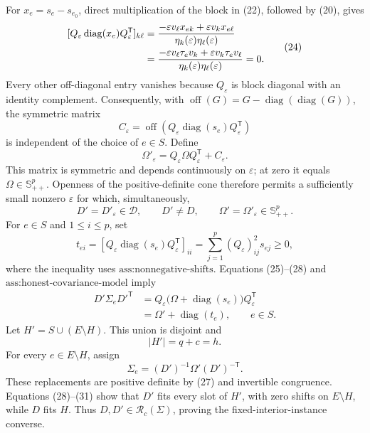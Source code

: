 For \(x_e=s_e-s_{e_0}\), direct multiplication of the block in (22), followed by (20), gives
\[
 \begin{aligned}
 \relax[Q_\varepsilon\operatorname{diag}(x_e)Q_\varepsilon^{\mathsf T}]_{k\ell}
 &=\frac{-\varepsilon v_\ell x_{ek}+\varepsilon v_kx_{e\ell}}
 {\eta_k(\varepsilon)\eta_\ell(\varepsilon)}\\
 &=\frac{-\varepsilon v_\ell\tau_ev_k+\varepsilon v_k\tau_ev_\ell}
 {\eta_k(\varepsilon)\eta_\ell(\varepsilon)}=0.
 \end{aligned}
 \tag{24}
\]
Every other off-diagonal entry vanishes because \(Q_\varepsilon\) is block diagonal with an identity complement.  Consequently, with \(\operatorname{off}(G)=G-\operatorname{diag}(\operatorname{diag}(G))\), the symmetric matrix
\[
 C_\varepsilon
 =\operatorname{off}\!\left(Q_\varepsilon
 \operatorname{diag}(s_e)Q_\varepsilon^{\mathsf T}\right)
 \tag{25}
\]
is independent of the choice of \(e\in S\).  Define
\[
 \Omega'_\varepsilon
 =Q_\varepsilon\Omega Q_\varepsilon^{\mathsf T}+C_\varepsilon.
 \tag{26}
\]
This matrix is symmetric and depends continuously on \(\varepsilon\); at zero it equals \(\Omega\in\mathbb S_{++}^p\).  Openness of the positive-definite cone therefore permits a sufficiently small nonzero \(\varepsilon\) for which, simultaneously,
\[
 D'=D'_{\varepsilon}\in\mathcal D,
 \qquad D'\ne D,
 \qquad \Omega'=\Omega'_\varepsilon\in\mathbb S_{++}^p.
 \tag{27}
\]
For \(e\in S\) and \(1\le i\le p\), set
\[
 t_{ei}
 =[Q_\varepsilon\operatorname{diag}(s_e)Q_\varepsilon^{\mathsf T}]_{ii}
 =\sum_{j=1}^p(Q_\varepsilon)_{ij}^2s_{ej}\ge0,
 \tag{28}
\]
where the inequality uses \(\text{ass:nonnegative-shifts}\).  Equations (25)--(28) and \(\text{ass:honest-covariance-model}\) imply
\[
 \begin{aligned}
 D'\Sigma_eD'^{\mathsf T}
 &=Q_\varepsilon\bigl(\Omega+\operatorname{diag}(s_e)\bigr)Q_\varepsilon^{\mathsf T}\\
 &=\Omega'+\operatorname{diag}(t_e),
 \qquad e\in S.
 \end{aligned}
 \tag{29}
\]
Let \(H'=S\cup(E\setminus H)\).  This union is disjoint and
\[
 |H'|=q+c=h.
 \tag{30}
\]
For every \(e\in E\setminus H\), assign
\[
 \Sigma_e=(D')^{-1}\Omega'(D')^{-\mathsf T}.
 \tag{31}
\]
These replacements are positive definite by (27) and invertible congruence.  Equations (28)--(31) show that \(D'\) fits every slot of \(H'\), with zero shifts on \(E\setminus H\), while \(D\) fits \(H\).  Thus \(D,D'\in\mathcal R_c(\Sigma)\), proving the fixed-interior-instance converse.

